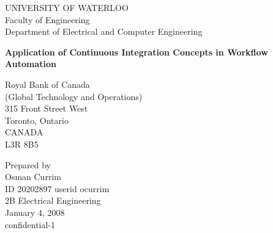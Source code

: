 \begin{titlepage}

	\begin{center} \Large
		UNIVERSITY OF WATERLOO\\
		Faculty of Engineering\\
		Department of Electrical and Computer Engineering
	\end{center}
	
	\vspace{1.2in}
	
	\begin{center} \large
		\textbf{Application of Continuous Integration Concepts in Workflow Automation}
	\end{center}
	
	\vfill
	
	\begin{center}
		Royal Bank of Canada\\
		(Global Technology and Operations)\\
		315 Front Street West\\
		Toronto, Ontario\\
		CANADA\\
		L3R 8B5
	\end{center}
	
	\vspace{0.5in}
	
	\begin{center}
		Prepared by\\
		Osman Currim\\
		ID 20202897 \textbar userid ocurrim\\
		2B Electrical Engineering\\
		January 4, 2008\\
		confidential-1
	\end{center}
	
\end{titlepage}